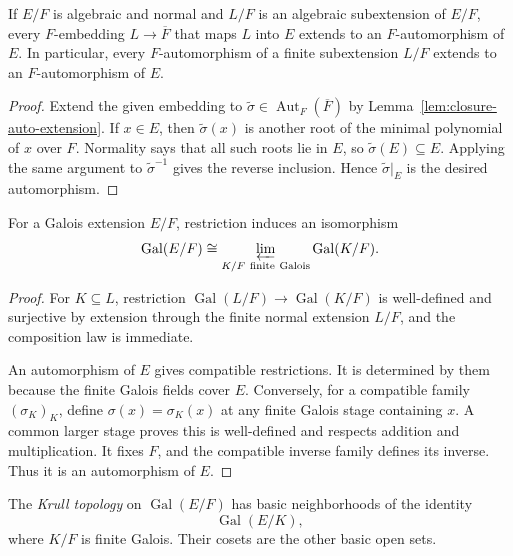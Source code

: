 \begin{lemma}
If \(E/F\) is algebraic and normal and \(L/F\) is an algebraic subextension
of \(E/F\), every \(F\)-embedding \(L\to\overline F\) that maps \(L\) into
\(E\) extends to an \(F\)-automorphism of \(E\).  In particular, every
\(F\)-automorphism of a finite subextension \(L/F\) extends to an
\(F\)-automorphism of \(E\).
\end{lemma}
\begin{proof}
Extend the given embedding to
\(\widetilde\sigma\in\operatorname{Aut}_F(\overline F)\) by
Lemma~\ref{lem:closure-auto-extension}.  If \(x\in E\), then
\(\widetilde\sigma(x)\) is another root of the minimal polynomial of \(x\)
over \(F\).  Normality says that all such roots lie in \(E\), so
\(\widetilde\sigma(E)\subseteq E\).  Applying the same argument to
\(\widetilde\sigma^{-1}\) gives the reverse inclusion.  Hence
\(\widetilde\sigma|_E\) is the desired automorphism.
\end{proof}

\begin{theorem}\label{thm:infinite-galois-limit}
For a Galois extension \(E/F\), restriction induces an isomorphism
\[
\operatorname{Gal}(E/F)\cong
\varprojlim_{K/F\ \mathrm{finite\ Galois}}\operatorname{Gal}(K/F).
\]
\end{theorem}
\begin{proof}
For \(K\subseteq L\), restriction
\(\operatorname{Gal}(L/F)\to\operatorname{Gal}(K/F)\) is well-defined and
surjective by extension through the finite normal extension \(L/F\), and the
composition law is immediate.

An automorphism of \(E\) gives compatible restrictions.  It is determined by
them because the finite Galois fields cover \(E\).  Conversely, for a
compatible family \((\sigma_K)_K\), define \(\sigma(x)=\sigma_K(x)\) at any
finite Galois stage containing \(x\).  A common larger stage proves this is
well-defined and respects addition and multiplication.  It fixes \(F\), and
the compatible inverse family defines its inverse.  Thus it is an
automorphism of \(E\).
\end{proof}

\begin{definition}
The \emph{Krull topology} on \(\operatorname{Gal}(E/F)\) has basic
neighborhoods of the identity
\[
\operatorname{Gal}(E/K),
\]
where \(K/F\) is finite Galois.  Their cosets are the other basic open sets.
\end{definition}


